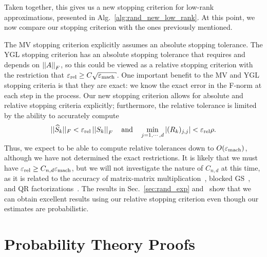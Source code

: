 Taken together, this gives us a new stopping criterion for low-rank
approximations, presented in Alg.~\ref{alg:rand_new_low_rank}.
At this point, we now compare our stopping criterion with the ones
previously mentioned.



The MV stopping criterion explicitly assumes an absolute stopping tolerance.
The YGL stopping criterion has an absolute stopping tolerance that
requires and depends on $\left| \left| A \right| \right|_{F}$, so this could be viewed
as a relative stopping criterion with the restriction
that $\epsr \ge C\sqrt{\epsm}$.
One important benefit to the MV and YGL stopping criteria
is that they are exact: we know the exact error in the F-norm
at each step in the process.
Our new stopping criterion allows for absolute and relative
stopping criteria explicitly; furthermore, the relative tolerance is
limited by the ability to accurately compute
%
\begin{equation}
    ||\widehat{S}_{k}||_{F} < \varepsilon_{\text{rel}}\left| \left| S_{k} \right| \right|_{F}
    \quad\text{and}\quad \min_{j=1,\cdots,d} |(R_{k})_{j,j}| < \varepsilon_{\text{rel}}\rho.
\end{equation}
%
Thus, we expect to be able to compute relative tolerances down to
$O(\varepsilon_{\text{mach}})$, although we have not determined the exact
restrictions.
It is likely that we must have $\varepsilon_{\text{rel}}\ge C_{n,d}\varepsilon_{\text{mach}}$,
but we will not investigate the nature of $C_{n,d}$ at this
time, as it is related to the accuracy of matrix-matrix
multiplication~\cite[Chapter 3]{HighamASNA},
blocked GS~\cite{bjorck1994GS,stewart2008},
and QR factorizations~\cite[Chapter 19]{HighamASNA}.
The results in Sec.~\ref{sec:rand_exp} and~\cite{randomHSSLBL}
show that we can obtain excellent
results using our relative stopping criterion
even though our estimates are probabilistic.



\section{Probability Theory Proofs}
\label{sec:rand_prob_theory_proofs}

